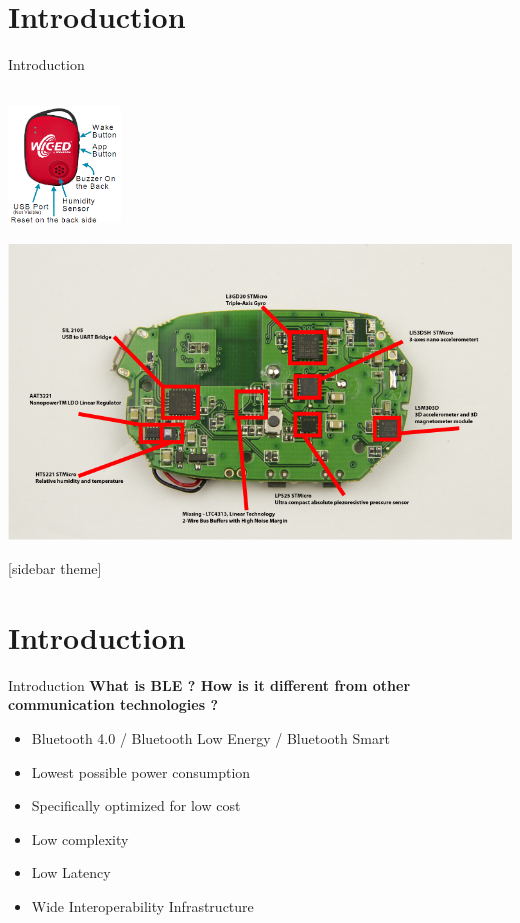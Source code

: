 \documentclass[10pt, a4paper]{beamer}
\begin{document}
\section{Introduction}
\begin{frame}{Introduction}
  \caption \textbf {WICED SENSE TAG}
  \centering
  \includegraphics[width=3cm, height=4cm]{broadcom-wiced-sense.png}
  \includegraphics[scale=0.3]{PCBLayoutFront.jpg}
  \end{frame}

[sidebar theme]
\section{Introduction}
\begin{frame}{Introduction}
  \textbf{What is BLE ? How is it different from other communication technologies ?}
  \begin{itemize}
  \item Bluetooth 4.0 / Bluetooth Low Energy / Bluetooth Smart
  \item Lowest possible power consumption
  \item Specifically optimized for low cost
  \item Low complexity
  \item Low Latency
  \item Wide Interoperability Infrastructure
  \end{itemize}
\end{frame}
\end{document}
